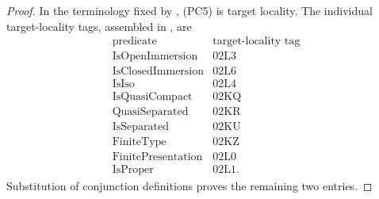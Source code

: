 \begin{proof}
  In the terminology fixed by
  \cite[\href{https://stacks.math.columbia.edu/tag/02KO}{Tag 02KO}]
  {stacks-project}, (PC5) is target locality.  The individual target-locality
  tags, assembled in
  \cite[\href{https://stacks.math.columbia.edu/tag/02WH}{Tag 02WH}]
  {stacks-project}, are
  \[
  \begin{array}{c|c}
    \text{predicate}&\text{target-locality tag}\\ \hline
    \operatorname{IsOpenImmersion}&\text{02L3}\\
    \operatorname{IsClosedImmersion}&\text{02L6}\\
    \operatorname{IsIso}&\text{02L4}\\
    \operatorname{IsQuasiCompact}&\text{02KQ}\\
    \operatorname{QuasiSeparated}&\text{02KR}\\
    \operatorname{IsSeparated}&\text{02KU}\\
    \operatorname{FiniteType}&\text{02KZ}\\
    \operatorname{FinitePresentation}&\text{02L0}\\
    \operatorname{IsProper}&\text{02L1}.
  \end{array}                                                       \tag{PC15}
  \]
  Substitution of conjunction definitions proves the remaining two entries.


\end{proof}
